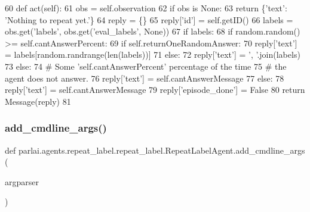 \begin{DoxyCode}
60     \textcolor{keyword}{def }act(self):
61         obs = self.observation
62         \textcolor{keywordflow}{if} obs \textcolor{keywordflow}{is} \textcolor{keywordtype}{None}:
63             \textcolor{keywordflow}{return} \{\textcolor{stringliteral}{'text'}: \textcolor{stringliteral}{'Nothing to repeat yet.'}\}
64         reply = \{\}
65         reply[\textcolor{stringliteral}{'id'}] = self.getID()
66         labels = obs.get(\textcolor{stringliteral}{'labels'}, obs.get(\textcolor{stringliteral}{'eval\_labels'}, \textcolor{keywordtype}{None}))
67         \textcolor{keywordflow}{if} labels:
68             \textcolor{keywordflow}{if} random.random() >= self.cantAnswerPercent:
69                 \textcolor{keywordflow}{if} self.returnOneRandomAnswer:
70                     reply[\textcolor{stringliteral}{'text'}] = labels[random.randrange(len(labels))]
71                 \textcolor{keywordflow}{else}:
72                     reply[\textcolor{stringliteral}{'text'}] = \textcolor{stringliteral}{', '}.join(labels)
73             \textcolor{keywordflow}{else}:
74                 \textcolor{comment}{# Some 'self.cantAnswerPercent' percentage of the time}
75                 \textcolor{comment}{# the agent does not answer.}
76                 reply[\textcolor{stringliteral}{'text'}] = self.cantAnswerMessage
77         \textcolor{keywordflow}{else}:
78             reply[\textcolor{stringliteral}{'text'}] = self.cantAnswerMessage
79         reply[\textcolor{stringliteral}{'episode\_done'}] = \textcolor{keyword}{False}
80         \textcolor{keywordflow}{return} Message(reply)
81 \end{DoxyCode}
\mbox{\label{classparlai_1_1agents_1_1repeat__label_1_1repeat__label_1_1RepeatLabelAgent_a8b226276eb5fee84571f4dc84d967aa3}} 
\subsubsection{\texorpdfstring{add\+\_\+cmdline\+\_\+args()}{add\_cmdline\_args()}}
{\footnotesize\ttfamily def parlai.\+agents.\+repeat\+\_\+label.\+repeat\+\_\+label.\+Repeat\+Label\+Agent.\+add\+\_\+cmdline\+\_\+args (\begin{DoxyParamCaption}\item[{}]{argparser }\end{DoxyParamCaption})\hspace{0.3cm}{\ttfamily [static]}}



